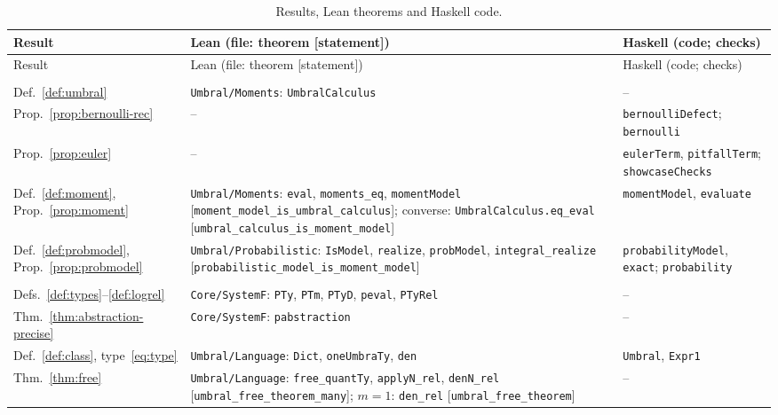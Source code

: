 \documentclass[11pt,a4paper]{report}
\theoremstyle{plain}
\theoremstyle{definition}
\theoremstyle{remark}
\begin{document}
{\footnotesize
\begin{longtable}{@{}>{\raggedright\arraybackslash}p{2.4cm}>{\raggedright\arraybackslash}p{6.1cm}>{\raggedright\arraybackslash}p{4.9cm}@{}}
\caption{Results, Lean theorems and Haskell code.}\label{tab:correspondence}\\
\toprule
Result & Lean (file: theorem [statement]) & Haskell (code; checks) \\
\midrule
\endfirsthead
\toprule
Result & Lean (file: theorem [statement]) & Haskell (code; checks) \\
\midrule
\endhead
\bottomrule
\endfoot
\multicolumn{3}{@{}l}{\emph{Chapter~\ref{ch:intro}}} \\
Def.~\ref{def:umbral} & \texttt{Umbral/Moments}: \texttt{UmbralCalculus} & -- \\
Prop.~\ref{prop:bernoulli-rec} & -- & \texttt{bernoulliDefect}; \texttt{bernoulli} \\
Prop.~\ref{prop:euler} & -- & \texttt{eulerTerm}, \texttt{pitfallTerm}; \texttt{showcaseChecks} \\
Def.~\ref{def:moment}, Prop.~\ref{prop:moment} & \texttt{Umbral/Moments}: \texttt{eval}, \texttt{moments\_eq}, \texttt{momentModel} [\texttt{moment\_model\_is\_umbral\_calculus}]; converse: \texttt{UmbralCalculus.eq\_eval} [\texttt{umbral\_calculus\_is\_moment\_model}] & \texttt{momentModel}, \texttt{evaluate} \\
Def.~\ref{def:probmodel}, Prop.~\ref{prop:probmodel} & \texttt{Umbral/Probabilistic}: \texttt{IsModel}, \texttt{realize}, \texttt{probModel}, \texttt{integral\_realize} [\texttt{probabilistic\_model\_is\_moment\_model}] & \texttt{probabilityModel}, \texttt{exact}; \texttt{probability} \\
\midrule
\multicolumn{3}{@{}l}{\emph{Chapter~\ref{ch:restricted}}} \\
Defs.~\ref{def:types}--\ref{def:logrel} & \texttt{Core/SystemF}: \texttt{PTy}, \texttt{PTm}, \texttt{PTyD}, \texttt{peval}, \texttt{PTyRel} & -- \\
Thm.~\ref{thm:abstraction-precise} & \texttt{Core/SystemF}: \texttt{pabstraction} & -- \\
Def.~\ref{def:class}, type~\eqref{eq:type} & \texttt{Umbral/Language}: \texttt{Dict}, \texttt{oneUmbraTy}, \texttt{den} & \texttt{Umbral}, \texttt{Expr1} \\
Thm.~\ref{thm:free} & \texttt{Umbral/Language}: \texttt{free\_quantTy}, \texttt{applyN\_rel}, \texttt{denN\_rel} [\texttt{umbral\_free\_theorem\_many}]; $m = 1$: \texttt{den\_rel} [\texttt{umbral\_free\_theorem}] & -- \\

\end{longtable}}
\end{document}
